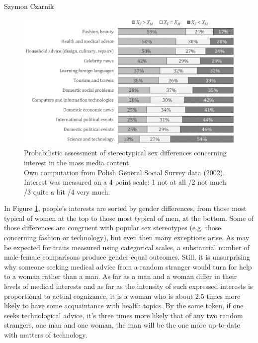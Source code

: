 \begin{artengenv}{Szymon Czarnik}
\begin{figure}[H]
	\centering
   \includegraphics[width=\textwidth]{ART_Czarnik/Czarnik-img021.jpg}
\caption{Probabilistic assessment of stereotypical sex differences concerning interest in the mass media content.\\
{\footnotesize Own computation from Polish General Social Survey data (2002). Interest was measured on a 4-point scale: 1 not at all /2 not much /3 quite a bit /4
very much.}
}\label{fig5-czar}
\end{figure}

In Figure \ref{fig5-czar}, people's interests are sorted by gender differences, from those most typical of women at the top to those most typical of men, at the bottom. Some of those differences are congruent with popular sex stereotypes (e.g. those concerning fashion or technology), but even then many exceptions arise. As may be expected for traits measured using categorical scales, a substantial number of male-female comparisons produce gender-equal outcomes. Still, it is unsurprising why someone seeking medical advice from a random stranger would turn for help to a woman rather than a man. As far as a man and a woman differ in their levels of medical interests and as far as the intensity of such expressed interests is proportional to actual cognizance, it is a woman who is about 2.5 times more likely to have some acquaintance with health topics. By the same token, if one seeks technological advice, it's three times more likely that of any two random strangers, one man and one woman, the man will be the one more up-to-date with matters of technology.


\end{artengenv}
